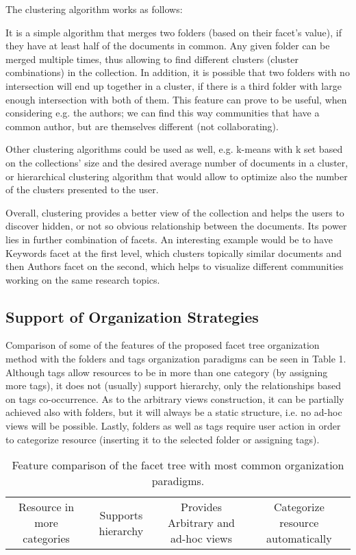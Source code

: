 \documentclass{article}
\begin{document}
    The clustering algorithm works as follows:
    
   It is a simple algorithm that merges two folders (based on their facet’s value), if they have at least half of the documents in common. Any given folder can be merged multiple times, thus allowing to find different clusters (cluster combinations) in the collection. In addition, it is possible that two folders with no intersection will end up together in a cluster, if there is a third folder with large enough intersection with both of them. This feature can prove to be useful, when considering e.g. the authors; we can find this way communities that have a common author, but are themselves different (not collaborating). 
  
  Other clustering algorithms could be used as well, e.g. k-means with k set based on the collections’ size and the desired average number of documents in a cluster, or hierarchical clustering algorithm that would allow to optimize also the number of the clusters presented to the user.
  
   Overall, clustering provides a better view of the collection and helps the users to discover hidden, or not so obvious relationship between the documents. Its power lies in further combination of facets. An interesting example would be to have Keywords facet at the first level, which clusters topically similar documents and then Authors facet on the second, which helps to visualize different communities working on the same research topics.
   
   \subsection{Support of Organization Strategies}
   
   Comparison of some of the features of the proposed facet tree organization method with the folders and tags organization paradigms can be seen in Table 1. Although tags allow resources to be in more than one category (by assigning more tags), it does not (usually) support hierarchy, only the relationships based on tags co-occurrence. As to the arbitrary views construction, it can be partially achieved also with folders, but it will always be a static structure, i.e. no ad-hoc views will be possible. Lastly, folders as well as tags require user action in order to categorize resource (inserting it to the selected folder or assigning tags). 
   
   
   \begin{table}
   \centering
   \caption{Feature comparison of the facet tree with most common organization paradigms.}
   \label{odkaz}
   \begin{tabular}{cccc }
   Resource in more categories &  Supports hierarchy & Provides
Arbitrary and ad-hoc views & Categorize resource
automatically \\
   
   \end{tabular}
   \end{table}
   
\end{document}

